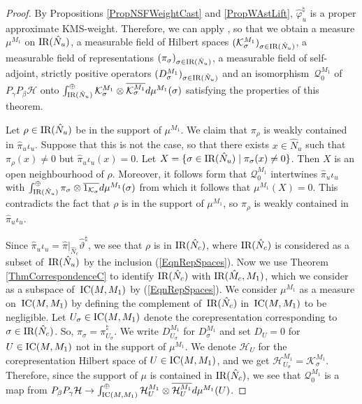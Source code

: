 \documentclass[pdftex]{sigma}
\numberwithin{equation}{section}
\theoremstyle{definition}
\newcommand{\cHil}{\mathcal{H}}
\newcommand{\ICMM}{\text{\rm IC}(M, M_1)}
\newcommand{\IR}{\text{\rm IR}}
\begin{document}
\begin{proof}
By  Propositions \ref{PropNSFWeightCast} and \ref{PropWAstLift}, $\hat{\varphi}_u^\natural$ is a proper approximate KMS-weight. Therefore, we can apply \cite[Theorem 3.4.5]{Des}, so that we obtain a measure $\mu^{M_1}$ on $\IR(\hat{N}_u)$, a measurable f\/ield of Hilbert spaces $(\mathcal{K}_\sigma^{M_1})_{\sigma \in \IR(\hat{N}_u)}$, a measurable f\/ield of representations $(\pi_\sigma)_{\sigma \in \IR(\hat{N}_u)}$, a measurable f\/ield of self-adjoint, strictly positive operators $(D_\sigma^{M_1})_{\sigma \in \IR(\hat{N}_u)}$ and an isomorphism~$\mathcal{Q}_0^{M_1}$ of $P_\gamma P_\beta \cHil$ onto $\int_{\IR(\hat{N}_u)}^\oplus \mathcal{K}_\sigma^{M_1} \otimes \overline{\mathcal{K}_\sigma^{M_1}} d \mu^{M_1}(\sigma)$ satisfying the properties of this theorem.



Let $\rho \in \IR(\hat{N}_u)$ be in the support of $\mu^{M_1}$.
We claim that $\pi_\rho$ is weakly contained in $\hat{\pi}_u \iota_u$. Suppose that this is not the case, so that there exists $x \in \hat{N}_u$ such that $\pi_\rho(x) \not = 0$ but $\hat{\pi}_u \iota_u(x)  = 0$. Let $X = \{ \sigma \in \IR(\hat{N}_u) \mid \pi_\sigma(x) \not = 0 \}$. Then $X$ is an open neighbourhood of $\rho$. Moreover, it follows form \cite[Theorem 3.4.5]{Des} that $\mathcal{Q}_0^{M_1}$ intertwines $\hat{\pi}_u \iota_u$ with $\int_{\IR(\hat{N}_u)}^\oplus \pi_\sigma \otimes \overline{1_{\mathcal{K}_\sigma}} d\mu^{M_1}(\sigma)$ from which it follows that $\mu^{M_1}(X) = 0$. This contradicts the fact that $\rho$ is in the support of $\mu^{M_1}$, so $\pi_\rho$ is weakly contained in $\hat{\pi}_u \iota_u$.

Since $\hat{\pi}_u \iota_u = \hat{\pi}\vert_{\hat{N}_c} \hat{\vartheta}^\natural$, we see that $\rho$ is in $\IR(\hat{N}_c)$, where $\IR(\hat{N}_c)$ is considered as a subset of~$\IR(\hat{N}_u)$ by the inclusion (\ref{EqnRepSpaces}).
Now we use Theorem \ref{ThmCorrespondenceC} to identify $\IR(\hat{N}_c)$ with $\IR(\hat{M}_c, M_1)$, which we consider as a subspace of~$\ICMM$ by (\ref{EqnRepSpaces}).  We consider $\mu^{M_1}$ as a measure on~$\ICMM$ by def\/ining the complement of~$\IR(\hat{N}_c)$ in~$\ICMM$ to be negligible. Let $U_\sigma \in \ICMM$ denote the corepresentation corresponding to $\sigma \in \IR(\hat{N}_c)$. So,
$
\pi_\sigma = \pi_{U_\sigma}^\natural.
$
We write $D_{U_\sigma}^{M_1}$ for $D_\sigma^{M_1}$ and set $D_U = 0$ for $U \in \ICMM $ not in the support of $\mu^{M_1}$. We denote $\cHil_U$ for the corepresentation Hilbert space of $U \in \ICMM$, and we get $\cHil_{U_\sigma}^{M_1} = \mathcal{K}_\sigma^{M_1}$.  Therefore, since the support of $\mu$ is contained in $\IR(\hat{N}_c)$, we see that $\mathcal{Q}_0^{M_1}$ is a map from $P_\beta P_\gamma \cHil \rightarrow \int^\oplus_{\ICMM} \cHil_U^{M_1} \otimes \overline{\cHil_U^{M_1}} d\mu^{M_1}(U)$.




\end{proof}
\end{document}
